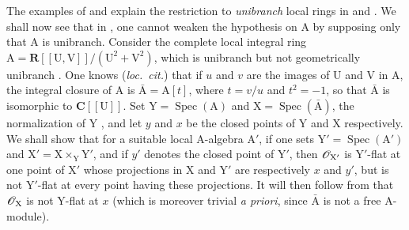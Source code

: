 \begin{env}[11.7.5]
\label{IV.11.7.5}
The examples of  and  explain the restriction to \emph{unibranch} local rings in  and .
We shall now see that in , one cannot weaken the hypothesis on $\mathrm{A}$ by supposing only that $\mathrm{A}$ is unibranch.
Consider the complete local integral ring $\mathrm{A}=\mathbf{R}[[\mathrm{U},\mathrm{V}]]/(\mathrm{U}^2+\mathrm{V}^2)$, which is unibranch but not geometrically unibranch .
One knows (\emph{loc.\ cit.}) that if $u$ and $v$ are the images of $\mathrm{U}$ and $\mathrm{V}$ in $\mathrm{A}$, the integral closure of $\mathrm{A}$ is $\bar{\mathrm{A}}=\mathrm{A}[t]$, where $t=v/u$ and $t^2=-1$, so that $\bar{\mathrm{A}}$ is isomorphic to $\mathbf{C}[[\mathrm{U}]]$.
Set $\mathrm{Y}=\operatorname{Spec}(\mathrm{A})$ and $\mathrm{X}=\operatorname{Spec}(\bar{\mathrm{A}})$, the normalization of $\mathrm{Y}$ , and let $y$ and $x$ be the closed points of $\mathrm{Y}$ and $\mathrm{X}$ respectively.
We shall show that for a suitable local $\mathrm{A}$-algebra $\mathrm{A}'$, if one sets $\mathrm{Y}'=\operatorname{Spec}(\mathrm{A}')$ and $\mathrm{X}'=\mathrm{X}\times_\mathrm{Y}\mathrm{Y}'$, and if $y'$ denotes the closed point of $\mathrm{Y}'$, then $\mathscr{O}_{\mathrm{X}'}$ is $\mathrm{Y}'$-flat at one point of $\mathrm{X}'$ whose projections in $\mathrm{X}$ and $\mathrm{Y}'$ are respectively $x$ and $y'$, but is not $\mathrm{Y}'$-flat at every point having these projections.
It will then follow from  that $\mathscr{O}_\mathrm{X}$ is not $\mathrm{Y}$-flat at $x$ (which is moreover trivial \emph{a priori}, since $\bar{\mathrm{A}}$ is not a free $\mathrm{A}$-module).


\end{env}
